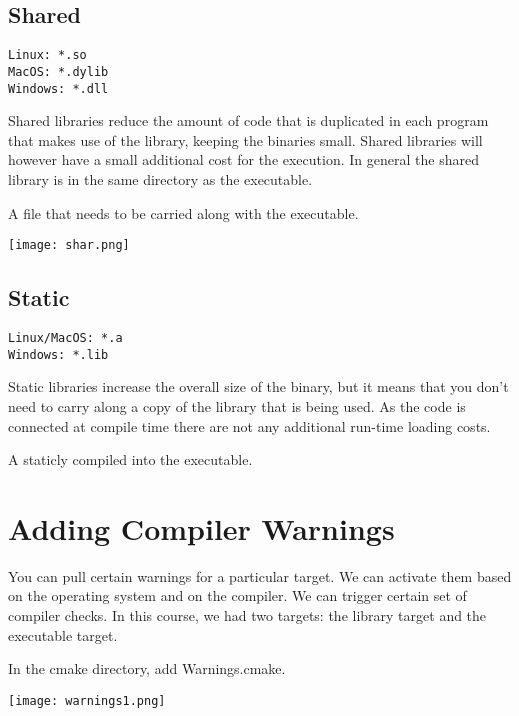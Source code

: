 \documentclass[openany]{report}
\begin{document}
\subsection{Shared}

\begin{verbatim}
Linux: *.so
MacOS: *.dylib
Windows: *.dll
\end{verbatim}

Shared libraries reduce the amount of code that is duplicated in each program that makes use of the library, keeping the binaries small.
Shared libraries will however have a small additional cost for the execution.
In general the shared library is in the same directory as the executable.

A file that needs to be carried along with the executable.

\begin{center}
    \texttt{[image: shar.png]}
\end{center}


\subsection{Static}

\begin{verbatim}
Linux/MacOS: *.a
Windows: *.lib
\end{verbatim}

Static libraries increase the overall size of the binary, but it means that you don't need to carry along a copy of the library that is being used.
As the code is connected at compile time there are not any additional run-time loading costs.

A staticly compiled into the executable.


\section{Adding Compiler Warnings}

You can pull certain warnings for a particular target. We can activate them based on the operating system and on the compiler.
We can trigger certain set of compiler checks. In this course, we had two targets: the library target and the executable target.

In the cmake directory, add Warnings.cmake. 


\begin{center}
    \texttt{[image: warnings1.png]}
\end{center}
\end{document}
